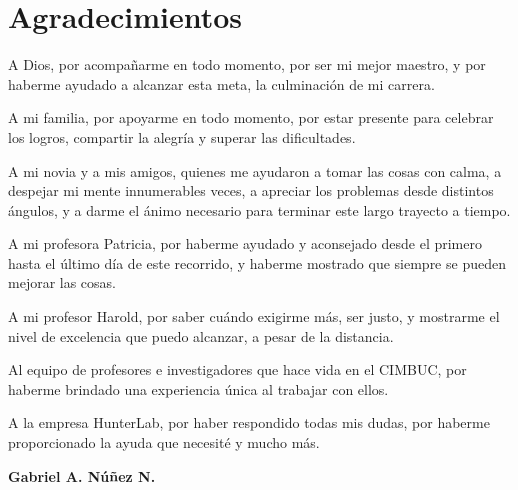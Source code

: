 \chapter*{Agradecimientos}

	A Dios, por acompa\~{n}arme en todo momento, por ser mi mejor maestro, y por haberme ayudado a alcanzar esta meta, la culminaci\'{o}n de mi carrera.

	A mi familia, por apoyarme en todo momento, por estar presente para celebrar los logros, compartir la alegr\'{i}a y superar las dificultades.

	A mi novia y a mis amigos, quienes me ayudaron a tomar las cosas con calma, a despejar mi mente innumerables veces, a apreciar los problemas desde distintos \'{a}ngulos, y a darme el \'{a}nimo necesario para terminar este largo trayecto a tiempo.

	A mi profesora Patricia, por haberme ayudado y aconsejado desde el primero hasta el \'{u}ltimo d\'{i}a de este recorrido, y haberme mostrado que siempre se pueden mejorar las cosas.

	A mi profesor Harold, por saber cu\'{a}ndo exigirme m\'{a}s, ser justo, y mostrarme el nivel de excelencia que puedo alcanzar, a pesar de la distancia.

	Al equipo de profesores e investigadores que hace vida en el CIMBUC, por haberme brindado una experiencia \'{u}nica al trabajar con ellos.

	A la empresa HunterLab, por haber respondido todas mis dudas, por haberme proporcionado la ayuda que necesit\'{e} y mucho m\'{a}s.


\begin{flushright}
	\textbf{Gabriel A. N\'{u}\~{n}ez N.}
\end{flushright}
